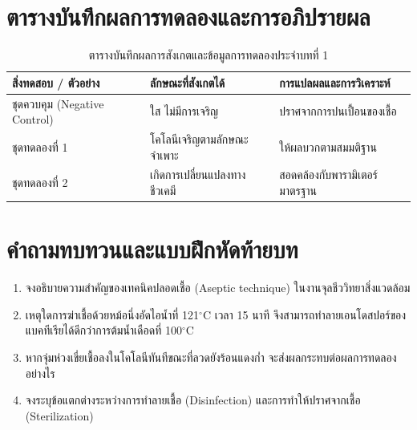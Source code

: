 \section{ตารางบันทึกผลการทดลองและการอภิปรายผล}
\begin{table}[H]
\centering\small
\caption{ตารางบันทึกผลการสังเกตและข้อมูลการทดลองประจำบทที่ 1}
\label{tab:ch01_datasheet}
\begin{tabularx}{\textwidth}{p{} p{} X}
\toprule
\textbf{สิ่งทดสอบ / ตัวอย่าง} & \textbf{ลักษณะที่สังเกตได้} & \textbf{การแปลผลและการวิเคราะห์} \\
\midrule
ชุดควบคุม (Negative Control) & ใส ไม่มีการเจริญ & ปราศจากการปนเปื้อนของเชื้อ \\
ชุดทดลองที่ 1 & โคโลนีเจริญตามลักษณะจำเพาะ & ให้ผลบวกตามสมมติฐาน \\
ชุดทดลองที่ 2 & เกิดการเปลี่ยนแปลงทางชีวเคมี & สอดคล้องกับพารามิเตอร์มาตรฐาน \\
\bottomrule
\end{tabularx}
\end{table}

\section{คำถามทบทวนและแบบฝึกหัดท้ายบท}
\begin{enumerate}
    \item จงอธิบายความสำคัญของเทคนิคปลอดเชื้อ (Aseptic technique) ในงานจุลชีววิทยาสิ่งแวดล้อม
    \item เหตุใดการฆ่าเชื้อด้วยหม้อนึ่งอัดไอน้ำที่ 121$^{\circ}$C เวลา 15 นาที จึงสามารถทำลายเอนโดสปอร์ของแบคทีเรียได้ดีกว่าการต้มน้ำเดือดที่ 100$^{\circ}$C
    \item หากจุ่มห่วงเขี่ยเชื้อลงในโคโลนีทันทีขณะที่ลวดยังร้อนแดงก่ำ จะส่งผลกระทบต่อผลการทดลองอย่างไร
    \item จงระบุข้อแตกต่างระหว่างการทำลายเชื้อ (Disinfection) และการทำให้ปราศจากเชื้อ (Sterilization)
\end{enumerate}
